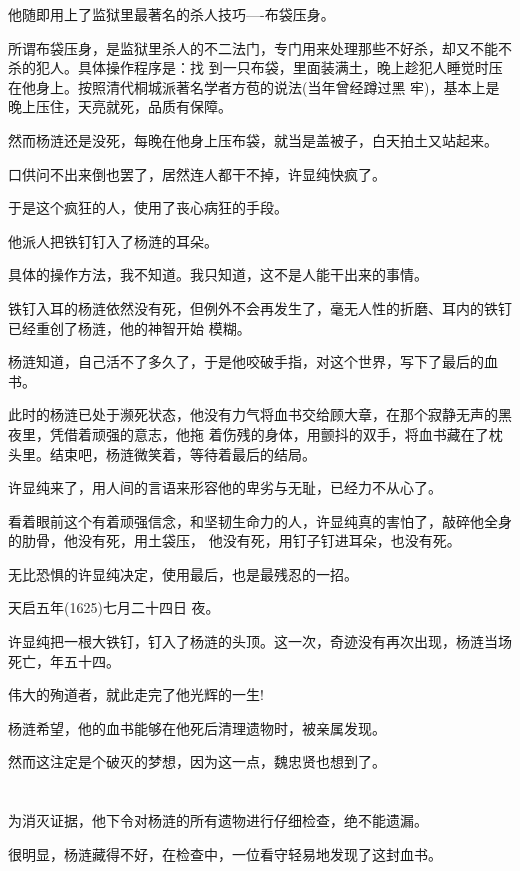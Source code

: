 \documentclass[11pt,a4paper,onecolumn]{article}
\begin{document}
他随即用上了监狱里最著名的杀人技巧----布袋压身。

所谓布袋压身，是监狱里杀人的不二法门，专门用来处理那些不好杀，却又不能不杀的犯人。具体操作程序是：找
到一只布袋，里面装满土，晚上趁犯人睡觉时压在他身上。按照清代桐城派著名学者方苞的说法(当年曾经蹲过黑
牢)，基本上是晚上压住，天亮就死，品质有保障。

然而杨涟还是没死，每晚在他身上压布袋，就当是盖被子，白天拍土又站起来。

口供问不出来倒也罢了，居然连人都干不掉，许显纯快疯了。

于是这个疯狂的人，使用了丧心病狂的手段。

他派人把铁钉钉入了杨涟的耳朵。

具体的操作方法，我不知道。我只知道，这不是人能干出来的事情。

铁钉入耳的杨涟依然没有死，但例外不会再发生了，毫无人性的折磨、耳内的铁钉已经重创了杨涟，他的神智开始
模糊。

杨涟知道，自己活不了多久了，于是他咬破手指，对这个世界，写下了最后的血书。

此时的杨涟已处于濒死状态，他没有力气将血书交给顾大章，在那个寂静无声的黑夜里，凭借着顽强的意志，他拖
着伤残的身体，用颤抖的双手，将血书藏在了枕头里。结束吧，杨涟微笑着，等待着最后的结局。

许显纯来了，用人间的言语来形容他的卑劣与无耻，已经力不从心了。

看着眼前这个有着顽强信念，和坚韧生命力的人，许显纯真的害怕了，敲碎他全身的肋骨，他没有死，用土袋压，
他没有死，用钉子钉进耳朵，也没有死。

无比恐惧的许显纯决定，使用最后，也是最残忍的一招。

天启五年(1625)七月二十四日 夜。

许显纯把一根大铁钉，钉入了杨涟的头顶。这一次，奇迹没有再次出现，杨涟当场死亡，年五十四。

伟大的殉道者，就此走完了他光辉的一生!

杨涟希望，他的血书能够在他死后清理遗物时，被亲属发现。

然而这注定是个破灭的梦想，因为这一点，魏忠贤也想到了。

\section[\thesection]{}

为消灭证据，他下令对杨涟的所有遗物进行仔细检查，绝不能遗漏。

很明显，杨涟藏得不好，在检查中，一位看守轻易地发现了这封血书。
\end{document}
